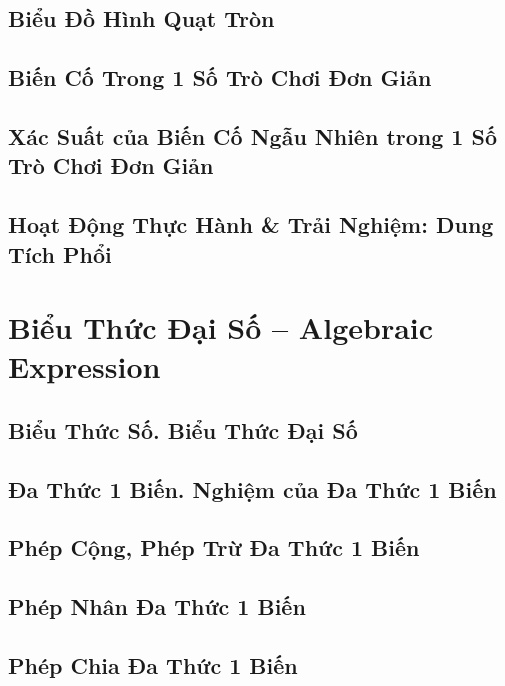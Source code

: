 \documentclass[oneside]{book}
\numberwithin{equation}{section}
\begin{document}
\section{Biểu Đồ Hình Quạt Tròn}

\section{Biến Cố Trong 1 Số Trò Chơi Đơn Giản}

\section{Xác Suất của Biến Cố Ngẫu Nhiên trong 1 Số Trò Chơi Đơn Giản}

\section{Hoạt Động Thực Hành \& Trải Nghiệm: Dung Tích Phổi}


\chapter{Biểu Thức Đại Số -- Algebraic Expression}

\section{Biểu Thức Số. Biểu Thức Đại Số}

\section{Đa Thức 1 Biến. Nghiệm của Đa Thức 1 Biến}

\section{Phép Cộng, Phép Trừ Đa Thức 1 Biến}

\section{Phép Nhân Đa Thức 1 Biến}

\section{Phép Chia Đa Thức 1 Biến}
\end{document}
